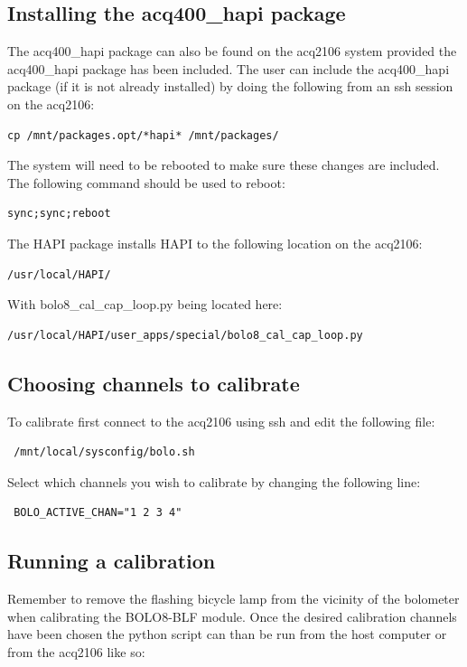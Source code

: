 \documentclass{article}
\begin{document}
\subsection{Installing the acq400\_hapi package}
The acq400\_hapi package can also be found on the acq2106 system provided the acq400\_hapi package has been included.
The user can include the acq400\_hapi package (if it is not already installed) by doing the following from an ssh session on the acq2106:
\begin{verbatim}cp /mnt/packages.opt/*hapi* /mnt/packages/\end{verbatim}
The system will need to be rebooted to make sure these changes are included.
The following command should be used to reboot:
\begin{verbatim}sync;sync;reboot\end{verbatim}

The HAPI package installs HAPI to the following location on the acq2106:

\begin{verbatim}
/usr/local/HAPI/
\end{verbatim}

With bolo8\_cal\_cap\_loop.py being located here:

\begin{verbatim}
/usr/local/HAPI/user_apps/special/bolo8_cal_cap_loop.py
\end{verbatim}

\subsection{Choosing channels to calibrate}

To calibrate first connect to the acq2106 using ssh and edit the following file:

\begin{verbatim} /mnt/local/sysconfig/bolo.sh \end{verbatim}

Select which channels you wish to calibrate by changing the following line:

\begin{verbatim} BOLO_ACTIVE_CHAN="1 2 3 4" \end{verbatim}

\subsection{Running a calibration}

Remember to remove the flashing bicycle lamp from the vicinity of the bolometer when calibrating the BOLO8-BLF module.
Once the desired calibration channels have been chosen the python script can than be run from the host computer or from the acq2106 like so:
\end{document}
